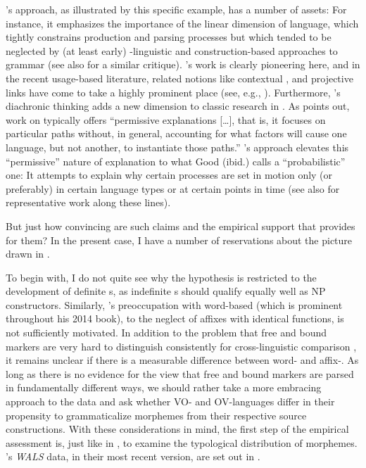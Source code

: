 \documentclass[output=paper]{langsci/langscibook}
\begin{document}
’s approach, as illustrated by this specific example, has a number of assets: For instance, it emphasizes the importance of the linear dimension of language, which tightly constrains production and parsing processes but which tended to be neglected by (at least early) -linguistic and construction-based approaches to grammar (see also \citealt{Diessel2011_Review} for a similar critique). ’s work is clearly pioneering here, and in the recent usage-based literature, related notions like contextual ,  and projective links have come to take a highly prominent place (see, e.g., \citealt{GahlGarnsey2004,Levy2008_Exp,Auer2009_Online}). Furthermore, ’s diachronic thinking adds a new dimension to classic research in . As \citet[7]{Good2008_Intro} points out, work on  typically offers “permissive explanations […], that is, it focuses on particular  paths without, in general, accounting for what factors will cause one language, but not another, to instantiate those paths.” ’s approach elevates this “permissive” nature of explanation to what Good (ibid.) calls a “probabilistic” one: It attempts to explain why certain  processes are set in motion only (or preferably) in certain language types or at certain points in time (see also \citealt{Hawkins1986_EngGer,Hawkins2012_Hist} for representative work along these lines).

But just how convincing are such claims and the empirical support that  provides for them? In the present case, I have a number of reservations about the picture drawn in \citet{Hawkins2014_VarEff}.

To begin with, I do not quite see why the hypothesis is restricted to the development of definite s, as indefinite s should qualify equally well as NP constructors. Similarly, ’s preoccupation with word-based  (which is prominent throughout his 2014 book), to the neglect of affixes with identical functions, is not sufficiently motivated. In addition to the problem that free and bound markers are very hard to distinguish consistently for cross-linguistic comparison \citep{Haspelmath2011_Word}, it remains unclear if there is a measurable  difference between word- and affix-. As long as there is no evidence for the view that free and bound  markers are parsed in fundamentally different ways, we should rather take a more embracing approach to the data and ask whether VO- and OV-languages differ in their propensity to grammaticalize  morphemes from their respective source constructions.
\newpage
With these considerations in mind, the first step of the empirical assessment is, just like in \citet{Hawkins2014_VarEff}, to examine the typological distribution of  morphemes. ’s \textit{WALS} data, in their most recent version, are set out in .
\end{document}
